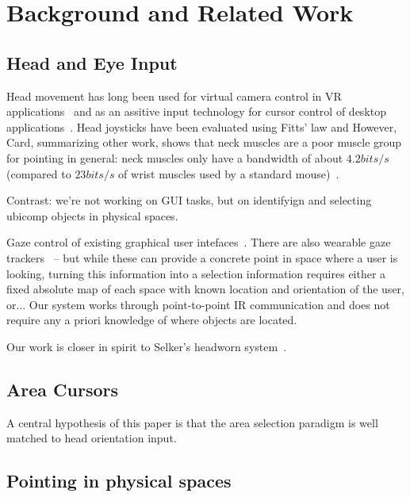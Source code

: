 \section{Background and Related Work}
\subsection{Head and Eye Input}
Head movement has long been used for virtual camera control in VR applications~\cite{pausch_user_1993} and as an assitive input technology for cursor control of desktop applications~\cite{}. Head joysticks have been evaluated using Fitts' law and  However, 
Card, summarizing other work, shows that neck muscles are a poor muscle group for pointing in general: neck muscles only have a bandwidth of about $4.2bits/s$ (compared to $23bits/s$ of wrist muscles used by a standard mouse)~\cite{Card:1991:MAD:123078.128726}. 

Contrast: we're not working on GUI tasks, but on identifyign and selecting ubicomp objects in physical spaces.

Gaze control of existing graphical user intefaces~\cite{kumar2007eyepoint}. There are also wearable gaze trackers~\cite{SMI} -- but while these can provide a concrete point in space where a user is looking, turning this information into a selection information requires either a fixed absolute map of each space with known location and orientation of the user, or... Our system works through point-to-point IR communication and does not require any a priori knowledge of where objects are located.

Our work is closer in spirit to Selker's headworn system~\cite{Selker:2001:EGE:634067.634176}.

\subsection{Area Cursors}
A central hypothesis of this paper is that the area selection paradigm is well matched to head orientation input.

\subsection{Pointing in physical spaces}

